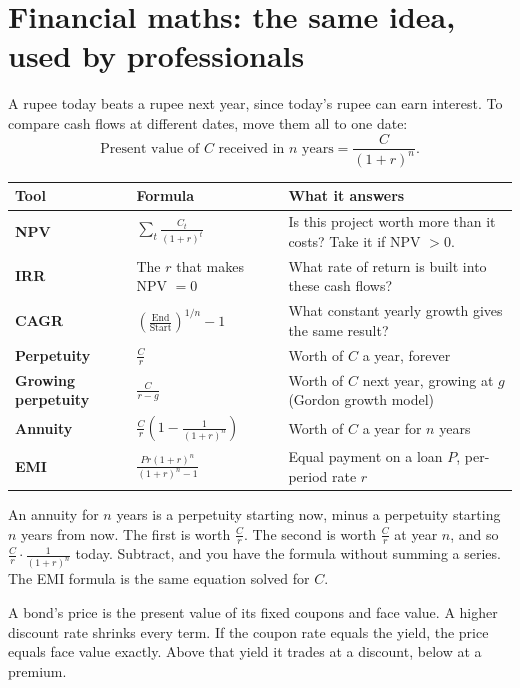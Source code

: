 \documentclass[11pt,a4paper,openany]{report}
\begin{document}
\section{Financial maths: the same idea, used by professionals}
\begin{idea}
A rupee today beats a rupee next year, since today's rupee can earn interest. To compare cash flows at different dates, move them all to one date:
\[\text{Present value of }C\text{ received in }n\text{ years}=\frac{C}{(1+r)^n}.\]
\end{idea}
\begin{center}\small
\begin{tabular}{>{\raggedright}p{3.2cm}>{\raggedright}p{5.3cm}>{\raggedright\arraybackslash}p{6cm}}
\toprule
Tool & Formula & What it answers\\\midrule
\textbf{NPV} & $\sum_t\frac{C_t}{(1+r)^t}$ & Is this project worth more than it costs? Take it if NPV $>0$.\\
\textbf{IRR} & The $r$ that makes NPV $=0$ & What rate of return is built into these cash flows?\\
\textbf{CAGR} & $\left(\frac{\text{End}}{\text{Start}}\right)^{1/n}-1$ & What constant yearly growth gives the same result?\\
\textbf{Perpetuity} & $\frac Cr$ & Worth of $C$ a year, forever\\
\textbf{Growing perpetuity} & $\frac C{r-g}$ & Worth of $C$ next year, growing at $g$ (Gordon growth model)\\
\textbf{Annuity} & $\frac Cr\left(1-\frac1{(1+r)^n}\right)$ & Worth of $C$ a year for $n$ years\\
\textbf{EMI} & $\frac{Pr(1+r)^n}{(1+r)^n-1}$ & Equal payment on a loan $P$, per-period rate $r$\\
\bottomrule
\end{tabular}
\end{center}

\begin{why}
An annuity for $n$ years is a perpetuity starting now, minus a perpetuity starting $n$ years from now. The first is worth $\frac Cr$. The second is worth $\frac Cr$ at year $n$, and so $\frac Cr\cdot\frac1{(1+r)^n}$ today. Subtract, and you have the formula without summing a series. The EMI formula is the same equation solved for $C$.
\end{why}

\begin{why}
A bond's price is the present value of its fixed coupons and face value. A higher discount rate shrinks every term. If the coupon rate equals the yield, the price equals face value exactly. Above that yield it trades at a discount, below at a premium.
\end{why}
\end{document}
